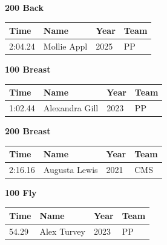 \vspace{1.2em}
\noindent\begin{minipage}[t]{0.98\textwidth}
\centering
\textbf{\textcolor{teamprimary}{200 Back}}\par
\vspace{0.5em}
\centering
\small
\renewcommand{\arraystretch}{1.0}
\setlength{\tabcolsep}{4pt}
\begin{tabular}{@{}p{2.5cm}p{4.5cm}p{1.5cm}p{2.5cm}@{}}
\toprule
\textbf{Time} & \textbf{Name} & \textbf{Year} & \textbf{Team} \\
\midrule
2:04.24 & Mollie Appl & 2025 & PP \\
\bottomrule
\end{tabular}
\end{minipage}
\vspace{1.2em}
\noindent\begin{minipage}[t]{0.98\textwidth}
\centering
\textbf{\textcolor{teamprimary}{100 Breast}}\par
\vspace{0.5em}
\centering
\small
\renewcommand{\arraystretch}{1.0}
\setlength{\tabcolsep}{4pt}
\begin{tabular}{@{}p{2.5cm}p{4.5cm}p{1.5cm}p{2.5cm}@{}}
\toprule
\textbf{Time} & \textbf{Name} & \textbf{Year} & \textbf{Team} \\
\midrule
1:02.44 & Alexandra Gill & 2023 & PP \\
\bottomrule
\end{tabular}
\end{minipage}
\vspace{1.2em}
\noindent\begin{minipage}[t]{0.98\textwidth}
\centering
\textbf{\textcolor{teamprimary}{200 Breast}}\par
\vspace{0.5em}
\centering
\small
\renewcommand{\arraystretch}{1.0}
\setlength{\tabcolsep}{4pt}
\begin{tabular}{@{}p{2.5cm}p{4.5cm}p{1.5cm}p{2.5cm}@{}}
\toprule
\textbf{Time} & \textbf{Name} & \textbf{Year} & \textbf{Team} \\
\midrule
2:16.16 & Augusta Lewis & 2021 & CMS \\
\bottomrule
\end{tabular}
\end{minipage}
\vspace{1.2em}
\noindent\begin{minipage}[t]{0.98\textwidth}
\centering
\textbf{\textcolor{teamprimary}{100 Fly}}\par
\vspace{0.5em}
\centering
\small
\renewcommand{\arraystretch}{1.0}
\setlength{\tabcolsep}{4pt}
\begin{tabular}{@{}p{2.5cm}p{4.5cm}p{1.5cm}p{2.5cm}@{}}
\toprule
\textbf{Time} & \textbf{Name} & \textbf{Year} & \textbf{Team} \\
\midrule
54.29 & Alex Turvey & 2023 & PP \\
\bottomrule
\end{tabular}
\end{minipage}
